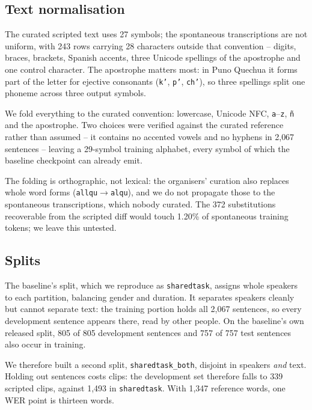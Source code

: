 \subsection{Text normalisation}

The curated scripted text uses 27 symbols; the spontaneous transcriptions are
not uniform, with 243 rows carrying 28 characters outside that convention --
digits, braces, brackets, Spanish accents, three Unicode spellings of the
apostrophe and one control character. The apostrophe matters most: in Puno
Quechua it forms part of the letter for ejective consonants (\texttt{k'},
\texttt{p'}, \texttt{ch'}), so three spellings split one phoneme across three
output symbols.

We fold everything to the curated convention: lowercase, Unicode NFC,
\texttt{a}--\texttt{z}, \texttt{ñ} and the apostrophe. Two choices were
verified against the curated reference rather than assumed -- it contains no
accented vowels and no hyphens in 2{,}067 sentences -- leaving a 29-symbol
training alphabet, every symbol of which the baseline checkpoint can already
emit.

The folding is orthographic, not lexical: the organisers' curation also
replaces whole word forms (\texttt{allqu}$\rightarrow$\texttt{alqu}), and we
do not propagate those to the spontaneous transcriptions, which nobody curated.
The 372 substitutions recoverable from the scripted diff would touch 1.20\% of
spontaneous training tokens; we leave this untested.

\subsection{Splits}
\label{sec:splits}

The baseline's split, which we reproduce as \texttt{sharedtask}, assigns whole
speakers to each partition, balancing gender and duration. It separates
speakers cleanly but cannot separate text: the training portion holds all
2{,}067 sentences, so every development sentence appears there, read by other
people. On the baseline's own released split, 805 of 805 development sentences
and 757 of 757 test sentences also occur in training.

We therefore built a second split, \texttt{sharedtask\_both}, disjoint in
speakers \emph{and} text. Holding out sentences costs clips: the
development set therefore falls to 339 scripted clips, against 1{,}493 in
\texttt{sharedtask}. With 1{,}347 reference words, one WER point is thirteen words.

